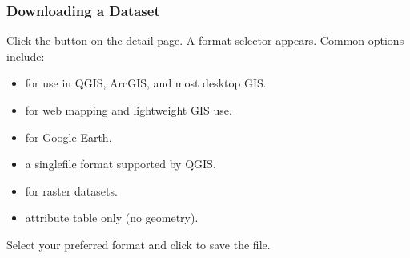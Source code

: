 \documentclass[letterpaper,10pt,english]{sphinxmanual}
\begin{document}
\subsubsection{Downloading a Dataset}
\label{\detokenize{en/02_find_and_visualize:downloading-a-dataset}}
\sphinxAtStartPar
Click the  button on the detail page. A format selector appears. Common
options include:
\begin{itemize}
\item {} 
\sphinxAtStartPar
{} \textendash{} for use in QGIS, ArcGIS, and most desktop GIS.

\item {} 
\sphinxAtStartPar
{} \textendash{} for web mapping and lightweight GIS use.

\item {} 
\sphinxAtStartPar
{} \textendash{} for Google Earth.

\item {} 
\sphinxAtStartPar
{} \textendash{} a single\sphinxhyphen{}file format supported by QGIS.

\item {} 
\sphinxAtStartPar
{} \textendash{} for raster datasets.

\item {} 
\sphinxAtStartPar
{} \textendash{} attribute table only (no geometry).

\end{itemize}

\sphinxAtStartPar
Select your preferred format and click  to save the file.

\sphinxstepscope
\end{document}
